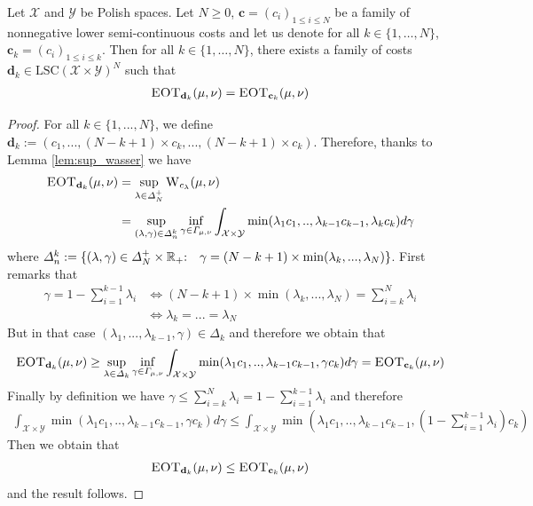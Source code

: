 \begin{prop}
\label{prop:gene-GOT}
Let $\mathcal{X}$ and $\mathcal{Y}$ be Polish spaces. Let $N\geq 0$, $\mathbf{c}=(c_i)_{1\leq i\leq N}$ be a family of nonnegative lower semi-continuous costs and let us denote for all $k\in\{1,\dots,N\}$, $\mathbf{c}_k=(c_i)_{1\leq i\leq k}$. Then for all $k\in\{1,\dots,N\}$, there exists a family of costs $\mathbf{d}_k\in\text{LSC}(\mathcal{X}\times\mathcal{Y})^N$ such that  
\begin{align}
    \textsc{EOT}_{\mathbf{d}_k}(\mu,\nu) = \textsc{EOT}_{\mathbf{c}_k}(\mu,\nu)
\end{align}
\end{prop}
\begin{proof}
For all $k\in\{1,...,N\}$, we define $\mathbf{d}_k:=(c_1,...,(N-k+1)\times c_k,...,(N-k+1)\times c_k)$. Therefore, thanks to Lemma \ref{lem:sup_wasser} we have
\begin{align}
\textsc{EOT}_{\mathbf{d}_k}(\mu,\nu)& = \sup_{\lambda\in\Delta_N^{+}} \textsc{W}_{c_\lambda}(\mu,\nu) \\
& = \sup_{(\lambda,\gamma)\in\Delta^k_n} \inf_{\gamma\in\Gamma_{\mu,\nu}}\int_{\mathcal{X}\times\mathcal{Y}} \min(\lambda_1 c_1,..,\lambda_{k-1}c_{k-1},\lambda_k c_k) d\gamma
\end{align}
where $\Delta^k_n:=\{(\lambda,\gamma)\in \Delta_N^{+}\times\mathbb{R}_{+}\text{:\quad } \gamma=(N-k+1)\times\min(\lambda_k,...,\lambda_N)\}$.
First remarks that
\begin{align}
    \gamma = 1 - \sum_{i=1}^{k-1} \lambda_i &\iff (N-k+1)\times\min(\lambda_k,...,\lambda_N) = \sum_{i=k}^{N} \lambda_i \\
    &\iff \lambda_k=...=\lambda_N
\end{align}
But in that case $(\lambda_1,...,\lambda_{k-1},\gamma)\in\Delta_k$ and therefore we obtain that 
\begin{align*}
     \textsc{EOT}_{\mathbf{d}_k}(\mu,\nu) \geq \sup_{\lambda\in\Delta_k}\inf_{\gamma\in\Gamma_{\mu,\nu}}  \int_{\mathcal{X}\times\mathcal{Y}} \min(\lambda_1 c_1,..,\lambda_{k-1}c_{k-1},\gamma c_k) d\gamma = \textsc{EOT}_{\mathbf{c}_k}(\mu,\nu) 
\end{align*}
Finally by definition we have  $\gamma\leq \sum_{i=k}^{N} \lambda_i = 1 -  \sum_{i=1}^{k-1} \lambda_i $ and therefore
\begin{align*}
 \int_{\mathcal{X}\times\mathcal{Y}} \min(\lambda_1 c_1,..,\lambda_{k-1}c_{k-1},\gamma c_k) d\gamma \leq  \int_{\mathcal{X}\times\mathcal{Y}} \min\left(\lambda_1 c_1,..,\lambda_{k-1}c_{k-1},\left(1 -  \sum_{i=1}^{k-1} \lambda_i\right) c_k\right) 
\end{align*}
Then we obtain that 
\begin{align*}
     \textsc{EOT}_{\mathbf{d}_k}(\mu,\nu)\leq  \textsc{EOT}_{\mathbf{c}_k}(\mu,\nu) 
\end{align*}
and the result follows.
\end{proof}

